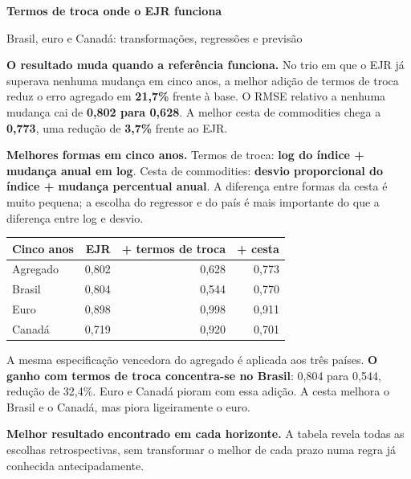 \documentclass[10pt,a4paper]{article}
\begin{document}
{\LARGE\bfseries\color{navy} Termos de troca onde o EJR funciona}\par
{\large Brasil, euro e Canadá: transformações, regressões e previsão}\par
\textbf{O resultado muda quando a referência funciona.} No trio em que o EJR já superava nenhuma mudança em cinco anos, a melhor adição de termos de troca reduz o erro agregado em \textbf{21,7\%} frente à base. O RMSE relativo a nenhuma mudança cai de \textbf{0,802 para 0,628}. A melhor cesta de commodities chega a \textbf{0,773}, uma redução de \textbf{3,7\%} frente ao EJR.

\textbf{Melhores formas em cinco anos.} Termos de troca: \textbf{log do índice + mudança anual em log}. Cesta de commodities: \textbf{desvio proporcional do índice + mudança percentual anual}. A diferença entre formas da cesta é muito pequena; a escolha do regressor e do país é mais importante do que a diferença entre log e desvio.

{\small
\begin{center}\begin{tabular}{lrrr}\toprule
Cinco anos & EJR & + termos de troca & + cesta \\ \midrule
Agregado & 0,802 & 0,628 & 0,773 \\
Brasil & 0,804 & 0,544 & 0,770 \\
Euro & 0,898 & 0,998 & 0,911 \\
Canadá & 0,719 & 0,920 & 0,701 \\\bottomrule\end{tabular}\end{center}}

A mesma especificação vencedora do agregado é aplicada aos três países. \textbf{O ganho com termos de troca concentra-se no Brasil}: 0,804 para 0,544, redução de 32,4\%. Euro e Canadá pioram com essa adição. A cesta melhora o Brasil e o Canadá, mas piora ligeiramente o euro.

\textbf{Melhor resultado encontrado em cada horizonte.} A tabela revela todas as escolhas retrospectivas, sem transformar o melhor de cada prazo numa regra já conhecida antecipadamente.
\end{document}
